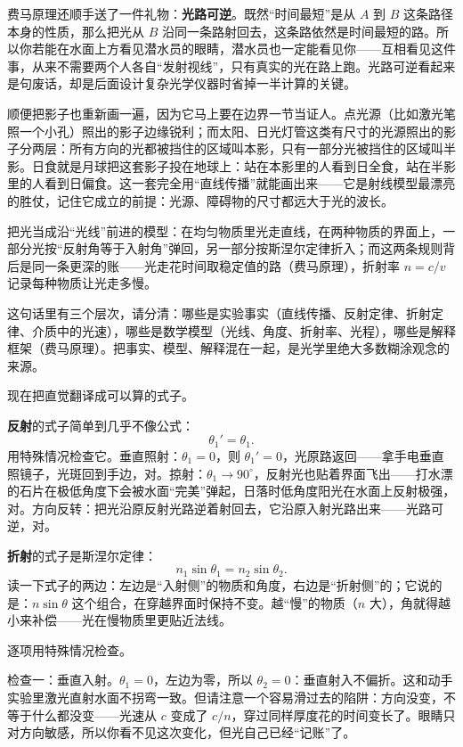 费马原理还顺手送了一件礼物：\textbf{光路可逆}。既然“时间最短”是从 \(A\) 到 \(B\) 这条路径本身的性质，那么把光从 \(B\) 沿同一条路射回去，这条路依然是时间最短的路。所以你若能在水面上方看见潜水员的眼睛，潜水员也一定能看见你——互相看见这件事，从来不需要两个人各自“发射视线”，只有真实的光在路上跑。光路可逆看起来是句废话，却是后面设计复杂光学仪器时省掉一半计算的关键。

顺便把影子也重新画一遍，因为它马上要在边界一节当证人。点光源（比如激光笔照一个小孔）照出的影子边缘锐利；而太阳、日光灯管这类有尺寸的光源照出的影子分两层：所有方向的光都被挡住的区域叫本影，只有一部分光被挡住的区域叫半影。日食就是月球把这套影子投在地球上：站在本影里的人看到日全食，站在半影里的人看到日偏食。这一套完全用“直线传播”就能画出来——它是射线模型最漂亮的胜仗，记住它成立的前提：光源、障碍物的尺寸都远大于光的波长。


\begin{oneline}
把光当成沿“光线”前进的模型：在均匀物质里光走直线，在两种物质的界面上，一部分光按“反射角等于入射角”弹回，另一部分按斯涅尔定律折入；而这两条规则背后是同一条更深的账——光走花时间取稳定值的路（费马原理），折射率 \(n=c/v\) 记录每种物质让光走多慢。
\end{oneline}

这句话里有三个层次，请分清：哪些是实验事实（直线传播、反射定律、折射定律、介质中的光速），哪些是数学模型（光线、角度、折射率、光程），哪些是解释框架（费马原理）。把事实、模型、解释混在一起，是光学里绝大多数糊涂观念的来源。


现在把直觉翻译成可以算的式子。

\textbf{反射}的式子简单到几乎不像公式：
\[
\theta_1'=\theta_1 .
\]
用特殊情况检查它。垂直照射：\(\theta_1=0\)，则 \(\theta_1'=0\)，光原路返回——拿手电垂直照镜子，光斑回到手边，对。掠射：\(\theta_1\to 90^\circ\)，反射光也贴着界面飞出——打水漂的石片在极低角度下会被水面“完美”弹起，日落时低角度阳光在水面上反射极强，对。方向反转：把光沿原反射光路逆着射回去，它沿原入射光路出来——光路可逆，对。

\textbf{折射}的式子是斯涅尔定律：
\[
n_1\sin\theta_1=n_2\sin\theta_2 .
\]
读一下式子的两边：左边是“入射侧”的物质和角度，右边是“折射侧”的；它说的是：\(n\sin\theta\) 这个组合，在穿越界面时保持不变。越“慢”的物质（\(n\) 大），角就得越小来补偿——光在慢物质里更贴近法线。

逐项用特殊情况检查。

检查一：垂直入射。\(\theta_1=0\)，左边为零，所以 \(\theta_2=0\)：垂直射入不偏折。这和动手实验里激光直射水面不拐弯一致。但请注意一个容易滑过去的陷阱：方向没变，不等于什么都没变——光速从 \(c\) 变成了 \(c/n\)，穿过同样厚度花的时间变长了。眼睛只对方向敏感，所以你看不见这次变化，但光自己已经“记账”了。

